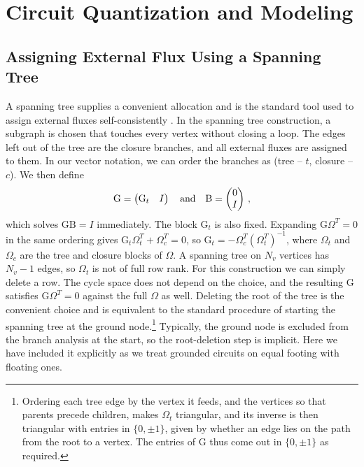 
\chapter{Circuit Quantization and Modeling}\label{apx:chp_quantization}

\section{Assigning External Flux Using a Spanning Tree}

A spanning tree supplies a convenient allocation and is the standard tool used to assign external fluxes self-consistently \cite{voolIntroductionQuantumElectromagnetic2017}. In the spanning tree construction, a subgraph is chosen that touches every vertex without closing a loop. The edges left out of the tree are the closure branches, and all external fluxes are assigned to them. In our vector notation, we can order the branches as (tree -- $t$, closure -- $c$). We then define
\begin{align}
    \mathrm{G} = \begin{pmatrix} \mathrm{G}_t & I \end{pmatrix} \quad {\rm and} \quad  \mathrm{B} = \begin{pmatrix} 0 \\ I \end{pmatrix} \, ,
    \label{eq:tree_B}
\end{align}
which solves $\mathrm{G}\mathrm{B}=I$ immediately.
The block $\mathrm{G}_t$ is also fixed.
Expanding $\mathrm{G}\Omega^T = 0$ in the same ordering gives $\mathrm{G}_t\Omega_t^T + \Omega_c^T = 0$, so $\mathrm{G}_t = -\Omega_c^T\left(\Omega_t^{T}\right)^{-1}$, where $\Omega_t$ and $\Omega_c$ are the tree and closure blocks of $\Omega$.
A spanning tree on $N_v$ vertices has $N_v-1$ edges, so $\Omega_t$ is not of full row rank.
For this construction we can simply delete a row.
The cycle space does not depend on the choice, and the resulting $\mathrm{G}$ satisfies $\mathrm{G}\Omega^T = 0$ against the full $\Omega$ as well.
Deleting the root of the tree is the convenient choice and is equivalent to the standard procedure of starting the spanning tree at the ground node.\footnote{Ordering each tree edge by the vertex it feeds, and the vertices so that parents precede children, makes $\Omega_t$ triangular, and its inverse is then triangular with entries in $\{0,\pm1\}$, given by whether an edge lies on the path from the root to a vertex.
The entries of $\mathrm{G}$ thus come out in $\{0,\pm1\}$ as required.}
Typically, the ground node is excluded from the branch analysis at the start, so the root-deletion step is implicit.
Here we have included it explicitly as we treat grounded circuits on equal footing with floating ones. 


